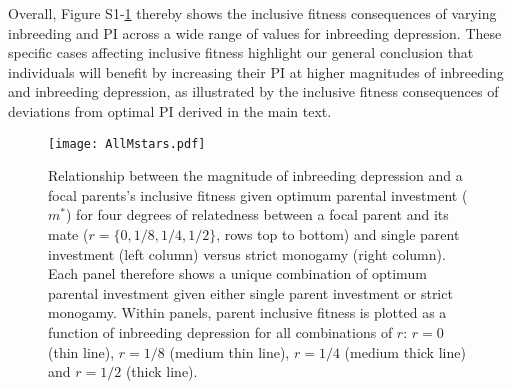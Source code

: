 \documentclass[12pt]{article}
\begin{document}
Overall, Figure S1-\ref{AllMstars} thereby shows the inclusive fitness consequences of varying inbreeding and PI across a wide range of values for inbreeding depression. These specific cases affecting inclusive fitness highlight our general conclusion that individuals will benefit by increasing their PI at higher magnitudes of inbreeding and inbreeding depression, as illustrated by the inclusive fitness consequences of deviations from optimal PI derived in the main text.

\clearpage

\begin{figure}[H]
\begin{center}				
\texttt{[image: AllMstars.pdf]}
\end{center}
\caption{Relationship between the magnitude of inbreeding depression and a focal parents's inclusive fitness given optimum parental investment ($m^{*}$) for four degrees of relatedness between a focal parent and its mate ($r=\{0, 1/8, 1/4, 1/2\}$, rows top to bottom) and single parent investment (left column) versus strict monogamy (right column). Each panel therefore shows a unique combination of optimum parental investment given either single parent investment or strict monogamy. Within panels, parent inclusive fitness is plotted as a function of inbreeding depression for all combinations of $r$: $r=0$ (thin line), $r=1/8$ (medium thin line), $r=1/4$ (medium thick line) and $r=1/2$ (thick line).}
\label{AllMstars}
\end{figure}

\clearpage



\end{document}
